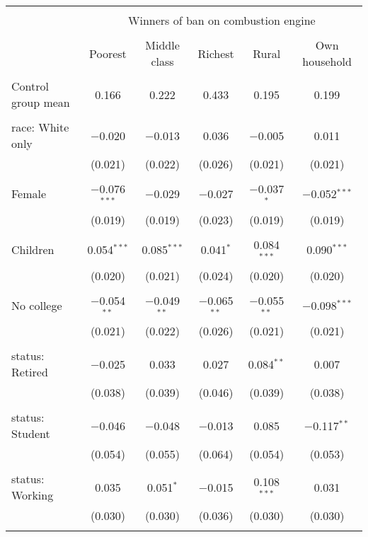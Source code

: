 
\begin{tabular}{@{\extracolsep{5pt}}lccccc} 
\\[-1.8ex]\hline 
\hline \\[-1.8ex] 
 & \multicolumn{5}{c}{Winners of ban on combustion engine} \\ 
\cline{2-6} 
\\[-1.8ex] & Poorest & Middle class & Richest & Rural & Own household \\ 
\hline \\[-1.8ex] 
 Control group mean & 0.166 & 0.222 & 0.433 & 0.195 & 0.199  \\ \hline \\[-1.8ex] race: White only & $-$0.020 & $-$0.013 & 0.036 & $-$0.005 & 0.011 \\ 
  & (0.021) & (0.022) & (0.026) & (0.021) & (0.021) \\ 
  & & & & & \\ 
 Female & $-$0.076$^{***}$ & $-$0.029 & $-$0.027 & $-$0.037$^{*}$ & $-$0.052$^{***}$ \\ 
  & (0.019) & (0.019) & (0.023) & (0.019) & (0.019) \\ 
  & & & & & \\ 
 Children & 0.054$^{***}$ & 0.085$^{***}$ & 0.041$^{*}$ & 0.084$^{***}$ & 0.090$^{***}$ \\ 
  & (0.020) & (0.021) & (0.024) & (0.020) & (0.020) \\ 
  & & & & & \\ 
 No college & $-$0.054$^{**}$ & $-$0.049$^{**}$ & $-$0.065$^{**}$ & $-$0.055$^{**}$ & $-$0.098$^{***}$ \\ 
  & (0.021) & (0.022) & (0.026) & (0.021) & (0.021) \\ 
  & & & & & \\ 
 status: Retired & $-$0.025 & 0.033 & 0.027 & 0.084$^{**}$ & 0.007 \\ 
  & (0.038) & (0.039) & (0.046) & (0.039) & (0.038) \\ 
  & & & & & \\ 
 status: Student & $-$0.046 & $-$0.048 & $-$0.013 & 0.085 & $-$0.117$^{**}$ \\ 
  & (0.054) & (0.055) & (0.064) & (0.054) & (0.053) \\ 
  & & & & & \\ 
 status: Working & 0.035 & 0.051$^{*}$ & $-$0.015 & 0.108$^{***}$ & 0.031 \\ 
  & (0.030) & (0.030) & (0.036) & (0.030) & (0.030) \\ 
  & & & & & \\ 

\end{tabular}
